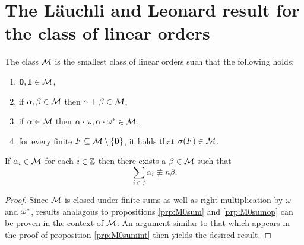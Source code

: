 \section{The L\"auchli and Leonard result for the class of linear orders}

\begin{dfn}
	The class $\mathcal{M}$ is the smallest class of linear orders such that the following holds:
	\begin{enumerate}
		\item	$\mathbf{0},\mathbf{1}\in\mathcal{M}$,
		\item	if $\alpha,\beta\in\mathcal{M}$ then $\alpha+\beta\in\mathcal{M}$,
		\item	if $\alpha\in\mathcal{M}$ then $\alpha\cdot\omega,\alpha\cdot{\omega}^\ast\in\mathcal{M}$,
		\item	for every finite $F\subseteq\mathcal{M}\setminus\left\lbrace \mathbf{0}\right\rbrace$, it holds that $\sigma(F)\in\mathcal{M}$.
	\end{enumerate}
\end{dfn}

\begin{prp}\label{prp:Msumint}
	If $\alpha_i\in\mathcal{M}$ for each $i\in\mathbb{Z}$ then there exists a $\beta\in\mathcal{M}$ such that
	\begin{equation}
		\sum_{i\in\zeta}\alpha_i\nequiv{n}\beta.
	\end{equation}
\end{prp}
\begin{proof}
	Since $\mathcal{M}$ is closed under finite sums as well as right multiplication by $\omega$ and ${\omega}^\ast$, results analagous to propositions \ref{prp:M0sum} and \ref{prp:M0sumop} can be proven in the context of $\mathcal{M}$.  An argument similar to that which appears in the proof of proposition \ref{prp:M0sumint} then yields the desired result.
\end{proof}

